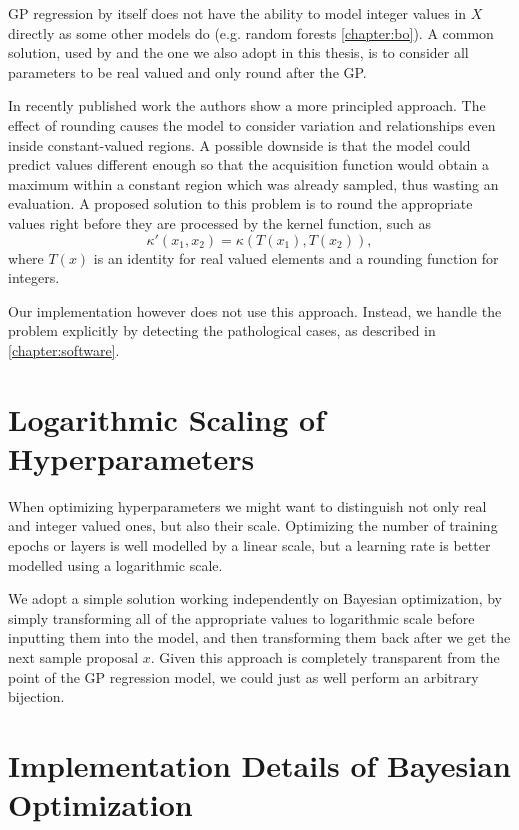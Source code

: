 GP regression by itself does not have the ability to model integer values in $X$ directly as some other models do (e.g. random forests \autoref{chapter:bo}). A common solution, used by \citep{spearmint} and the one we also adopt in this thesis, is to consider all parameters to be real valued and only round after the GP.

In recently published work \cite{integer-valued-gp} the authors show a more principled approach. The effect of rounding causes the model to consider variation and relationships even inside constant-valued regions. A possible downside is that the model could predict values different enough so that the acquisition function would obtain a maximum within a constant region which was already sampled, thus wasting an evaluation. A proposed solution to this problem is to round the appropriate values right before they are processed by the kernel function, such as
$$\kappa'(x_1, x_2) = \kappa(T(x_1), T(x_2)),$$ where $T(x)$ is an identity for real valued elements and a rounding function for integers.

Our implementation however does not use this approach. Instead, we handle the problem explicitly by detecting the pathological cases, as described in \autoref{chapter:software}.

\section{Logarithmic Scaling of Hyperparameters}

When optimizing hyperparameters we might want to distinguish not only real and integer valued ones, but also their scale. Optimizing the number of training epochs or layers is well modelled by a linear scale, but a learning rate is better modelled using a logarithmic scale.

We adopt a simple solution working independently on Bayesian optimization, by simply transforming all of the appropriate values to logarithmic scale before inputting them into the model, and then transforming them back after we get the next sample proposal $x$. Given this approach is completely transparent from the point of the GP regression model, we could just as well perform an arbitrary bijection.


\section{Implementation Details of Bayesian Optimization}
\label{section:bopt-alg}

